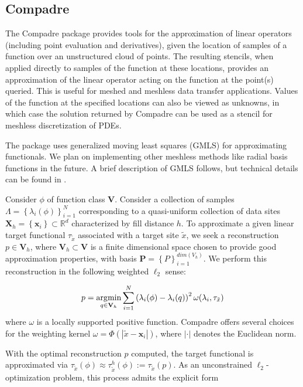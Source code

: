 \subsection{Compadre}
The Compadre package provides tools for the approximation of linear operators (including point evaluation and derivatives), given the location of samples of a function over an unstructured cloud of points. The resulting stencils, when applied directly to samples of the function at these locations, provides an approximation of the linear operator acting on the function at the point(s) queried. This is useful for meshed and meshless data transfer applications. Values of the function at the specified locations can also be viewed as unknowns, in which case the solution returned by Compadre can be used as a stencil for meshless discretization of PDEs. 

The package uses generalized moving least squares (GMLS) for approximating functionals. We plan on implementing other meshless methods like radial basis functions in the future.  A brief description of GMLS follows, but technical details can be found in \cite{mirzaei2012generalized,wendland2004scattered}.

Consider $\phi$ of function class $\mathbf{V}$. Consider a collection of samples $\Lambda = \left\{\lambda_i(\phi)\right\}_{i=1}^{N}$ corresponding to a quasi-uniform\cite{wendland2004scattered} collection of data sites $\mathbf{X}_h = \left\{\mathbf{x}_i\right\} \subset \mathbb{R}^d$ characterized by fill distance $h$. To approximate a given linear target functional $\tau_{\tilde{x}}$ associated with a target site $\tilde{x}$, we seek a reconstruction $p \in \mathbf{V}_h$, where $\mathbf{V}_h \subset \mathbf{V}$ is a finite dimensional space chosen to provide good approximation properties, with basis $\mathbf{P}=\left\{P\right\}_{i=1}^{dim(V_h)}$. We perform this reconstruction in the following weighted $\ell_2$ sense:

\begin{equation}
\label{gmls}
p = \underset{{q \in \mathbf{V}_h}}{\operatorname*{\arg\!\min}} \sum_{i=1}^N \left( \lambda_i(\phi) -\lambda_i(q) \right)^2 \omega(\lambda_i,\tau_{\tilde{x}})
\end{equation}
where $\omega$ is a locally supported positive function. Compadre offers several choices for the weighting kernel $\omega = \Phi(|\tilde{x}-\mathbf{x}_i|)$, where $|\cdot|$ denotes the Euclidean norm.

With the optimal reconstruction $p$ computed, the target functional is approximated via $\tau_{\tilde{x}} (\phi) \approx \tau^h_{\tilde{x}} (\phi) := \tau_{\tilde{x}} (p)$. As an unconstrained $\ell_2$-optimization problem, this process admits the explicit form


